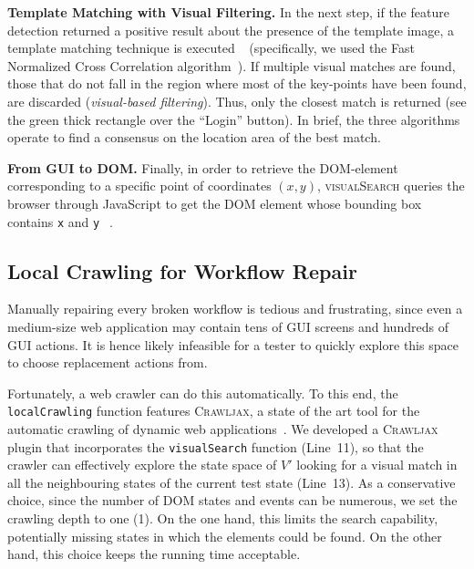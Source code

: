 \noindent
\textbf{Template Matching with Visual Filtering.}
In the next step, if the feature detection returned a positive result about the presence of the template image, a template matching technique is executed~\textcircled{} (specifically, we used the Fast Normalized Cross Correlation algorithm~\cite{briechle2001template}). 
If multiple visual matches are found, those that do not fall in the region where most of the key-points have been found, are discarded (\textit{visual-based filtering}). 
Thus, only the closest match is returned (see the green thick rectangle over the ``Login'' button). In brief, the three algorithms operate to find a consensus on the location area of the best match.

\noindent
\textbf{From GUI to DOM.}
Finally, in order to retrieve the DOM-element corresponding to a specific point of coordinates $(x,y)$, \textsc{visualSearch} queries the browser through JavaScript 
to get the DOM element whose bounding box contains \texttt{x} and \texttt{y}~\textcircled{}.


\subsection{Local Crawling for Workflow Repair}

Manually repairing every broken workflow is tedious and frustrating, since even a medium-size web application may contain tens of GUI screens and hundreds of GUI actions. It is hence likely infeasible for a tester to quickly explore this space to choose replacement actions from.

Fortunately, a web crawler can do this automatically. To this end, the \texttt{localCrawling} function features \textsc{Crawljax}, a state of the art tool for the automatic crawling of dynamic web applications~\cite{mesbah:tweb12,mesbah:tse12}. We developed a \textsc{Crawljax} plugin that incorporates the \texttt{visualSearch} function (Line~11), so that the crawler can effectively explore the state space of $V'$ looking for a visual match in all the neighbouring states of the current test state (Line~13). As a conservative choice, since the number of DOM states and events can be numerous, we set the crawling depth to one (1). On the one hand, this limits the search capability, potentially missing states in which the elements could be found. On the other hand, this choice keeps the running time acceptable.

